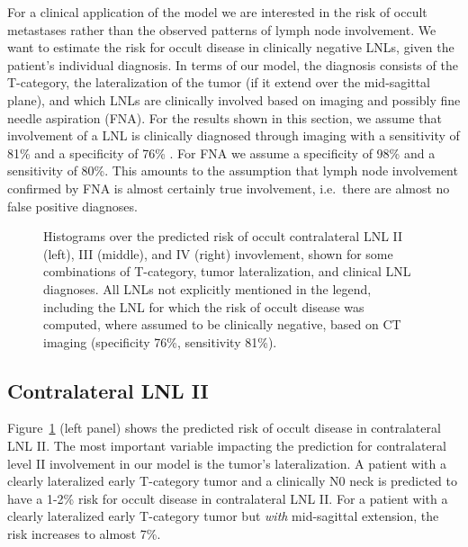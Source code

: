 \documentclass[
  sn-mathphys-num,
]{sn-jnl}
\begin{document}
For a clinical application of the model we are interested in the risk of
occult metastases rather than the observed patterns of lymph node
involvement. We want to estimate the risk for occult disease in
clinically negative LNLs, given the patient's individual diagnosis. In
terms of our model, the diagnosis consists of the T-category, the
lateralization of the tumor (if it extend over the mid-sagittal plane),
and which LNLs are clinically involved based on imaging and possibly
fine needle aspiration (FNA). For the results shown in this section, we
assume that involvement of a LNL is clinically diagnosed through imaging
with a sensitivity of 81\% and a specificity of 76\%
\citep{de_bondt_detection_2007}. For FNA we assume a specificity of 98\%
and a sensitivity of 80\%. This amounts to the assumption that lymph
node involvement confirmed by FNA is almost certainly true involvement,
i.e.~there are almost no false positive diagnoses.

\begin{figure}


\caption{\label{fig-model-risks}Histograms over the predicted risk of
occult contralateral LNL II (left), III (middle), and IV (right)
invovlement, shown for some combinations of T-category, tumor
lateralization, and clinical LNL diagnoses. All LNLs not explicitly
mentioned in the legend, including the LNL for which the risk of occult
disease was computed, where assumed to be clinically negative, based on
CT imaging (specificity 76\%, sensitivity 81\%).}

\end{figure}%

\subsection{Contralateral LNL II}\label{contralateral-lnl-ii}

Figure~\ref{fig-model-risks} (left panel) shows the predicted risk of
occult disease in contralateral LNL II. The most important variable
impacting the prediction for contralateral level II involvement in our
model is the tumor's lateralization. A patient with a clearly
lateralized early T-category tumor and a clinically N0 neck is predicted
to have a 1-2\% risk for occult disease in contralateral LNL II. For a
patient with a clearly lateralized early T-category tumor but
\emph{with} mid-sagittal extension, the risk increases to almost 7\%.
\end{document}

